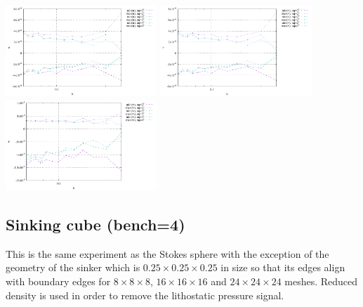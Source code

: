 \begin{center}
\includegraphics[width=5.7cm]{python_codes/fieldstone_82/RESULTS/bench3/u.pdf}
\includegraphics[width=5.7cm]{python_codes/fieldstone_82/RESULTS/bench3/v.pdf}
\includegraphics[width=5.7cm]{python_codes/fieldstone_82/RESULTS/bench3/w.pdf}
\end{center}







\newpage
\subsection*{Sinking cube (bench=4)}

This is the same experiment as the Stokes sphere with the exception of the geometry of the sinker which 
is $0.25\times 0.25 \times 0.25$ in size so that its edges align with boundary edges 
for $8 \times 8 \times 8$, $16 \times 16 \times 16$ and $24 \times 24 \times 24$ meshes.
Reduced density is used in order to remove the lithostatic pressure signal.
 
